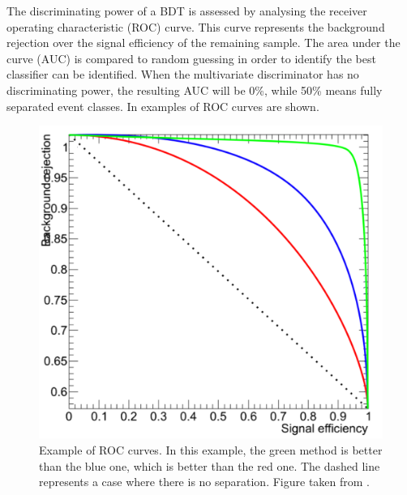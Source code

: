 %


The discriminating power of a BDT is assessed by analysing the receiver operating characteristic (ROC) curve. This curve represents the background rejection over the signal efficiency of the remaining sample. The area under the curve (AUC) is compared to  random guessing in order to identify the best classifier can be identified. 
When the multivariate discriminator has no discriminating power, the resulting AUC will be 0\%, while 50\%  means fully separated event classes. In  examples of ROC curves are shown. 
\begin{figure}[htbp]
	\centering
	\includegraphics[width=0.7\linewidth]{3_Analysis_techniques/Figures/ROC}
	\caption{Example of ROC curves. In this example, the green method is better than the blue one, which is better than the red one. The dashed line represents a case where there is no separation. Figure taken from \cite{ROC}.}
	\label{fig:ROC}
\end{figure}




